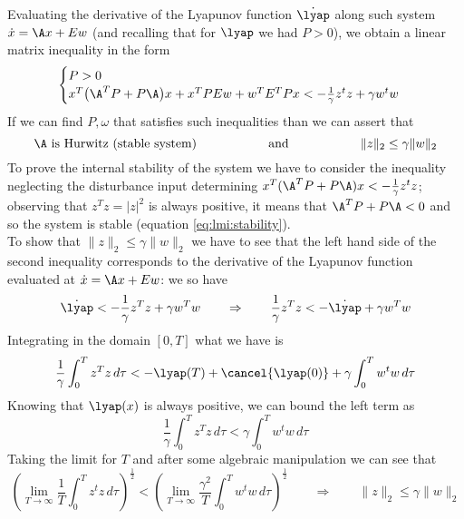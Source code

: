 	Evaluating the derivative of the Lyapunov function $\dot \lyap$ along such system $\dot x = \A x + E w$ (and recalling that for $\lyap$ we had $P>0$), we obtain a linear matrix inequality in the form
	\begin{equation} \label{eq:lmi:temp1}
	\begin{cases}
		P > 0 \\
		x^T\big(\A^T P + P \A\big) x + x^T P E w + w^T E^T P x < - \frac 1 \gamma z^t z + \gamma w^t w
	\end{cases}
	\end{equation}
	If we can find $P,\omega$ that satisfies such inequalities than we can assert that
	\[ \A \textrm{ is Hurwitz (stable system)} \hspace{2cm} \textrm{and} \hspace{2cm} \|z\|_2 \leq \gamma \|w\|_2 \]
	To prove the internal stability of the system we have to consider the inequality neglecting the disturbance input determining $x^T(\A^TP+P\A)x < -\frac 1 \gamma z^t z$; observing that $z^T z = |z|^2$ is always positive, it means that $\A^TP + P\A < 0$ and so the system is stable (equation \ref{eq:lmi:stability}).\\
	To show that $\|z\|_2 \leq \gamma \|w\|_2$ we have to see that the left hand side of the second inequality corresponds to the derivative of the Lyapunov function evaluated at $\dot x= \A x + Ew$: we so have
	\[ \dot \lyap < - \frac 1 \gamma z^T z + \gamma w^T w \qquad \Rightarrow \qquad \frac 1 \gamma z^T z < - \dot \lyap + \gamma w^T w \]
	Integrating in the domain $[0,T]$ what we have is
	\[ \frac 1 \gamma \int_0^T z^T z \, d\tau < - \lyap(T) + \cancel{\lyap(0)} + \gamma \int_0^T w^t w\, d\tau \]
	Knowing that $\lyap(x)$ is always positive, we can bound the left term as
	\[ \frac 1 \gamma \int_0^T z^T z \, d\tau < \gamma \int_0^T w^t w\, d\tau  \]
	Taking the limit for $T$ and after some algebraic manipulation we can see that
	\[ \left( \lim_{T\rightarrow\infty} \frac 1 T \int_0^T z^t z \, d\tau \right)^{\frac 1 2} < \left( \lim_{T\rightarrow\infty}  \frac{\gamma^2}T \int_0^T w^t w \, d\tau \right)^{\frac 1 2} \qquad\Rightarrow \qquad \|z\|_2 \leq \gamma \|w\|_2 \]
	
